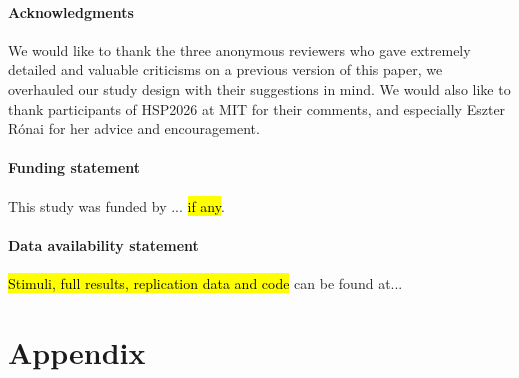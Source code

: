 \documentclass[a4paper, ruler]{CUP-JNL-LIN}%
\begin{document}
\begin{Backmatter}

\paragraph{Acknowledgments}
We would like to thank the three anonymous reviewers who gave extremely detailed and valuable criticisms on a previous version of this paper, we overhauled our study design with their suggestions in mind. We would also like to thank participants of HSP2026 at MIT for their comments, and especially Eszter Rónai for her advice and encouragement.

\paragraph{Funding statement}
This study was funded by ... \hl{if any}.

\paragraph{Data availability statement} \label{sec:data-statement}
\hl{Stimuli, full results, replication data and code} can be found at...

\clearpage

\section*{Appendix}


\end{Backmatter}
\end{document}
